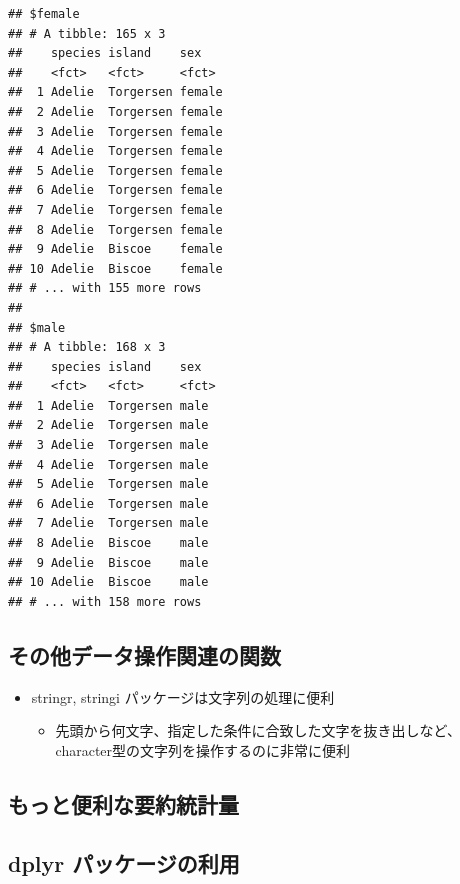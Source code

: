 \documentclass[
]{ltjsarticle}
\providecommand{\tightlist}{%
  \setlength{\itemsep}{0pt}\setlength{\parskip}{0pt}}
\begin{document}
\begin{verbatim}
## $female
## # A tibble: 165 x 3
##    species island    sex   
##    <fct>   <fct>     <fct> 
##  1 Adelie  Torgersen female
##  2 Adelie  Torgersen female
##  3 Adelie  Torgersen female
##  4 Adelie  Torgersen female
##  5 Adelie  Torgersen female
##  6 Adelie  Torgersen female
##  7 Adelie  Torgersen female
##  8 Adelie  Torgersen female
##  9 Adelie  Biscoe    female
## 10 Adelie  Biscoe    female
## # ... with 155 more rows
## 
## $male
## # A tibble: 168 x 3
##    species island    sex  
##    <fct>   <fct>     <fct>
##  1 Adelie  Torgersen male 
##  2 Adelie  Torgersen male 
##  3 Adelie  Torgersen male 
##  4 Adelie  Torgersen male 
##  5 Adelie  Torgersen male 
##  6 Adelie  Torgersen male 
##  7 Adelie  Torgersen male 
##  8 Adelie  Biscoe    male 
##  9 Adelie  Biscoe    male 
## 10 Adelie  Biscoe    male 
## # ... with 158 more rows
\end{verbatim}

\hypertarget{ux305dux306eux4ed6ux30c7ux30fcux30bfux64cdux4f5cux95a2ux9023ux306eux95a2ux6570}{%
\subsection{その他データ操作関連の関数}\label{ux305dux306eux4ed6ux30c7ux30fcux30bfux64cdux4f5cux95a2ux9023ux306eux95a2ux6570}}

\begin{itemize}
\tightlist
\item
  stringr, stringi パッケージは文字列の処理に便利

  \begin{itemize}
  \tightlist
  \item
    先頭から何文字、指定した条件に合致した文字を抜き出しなど、character型の文字列を操作するのに非常に便利
  \end{itemize}
\end{itemize}

\hypertarget{ux3082ux3063ux3068ux4fbfux5229ux306aux8981ux7d04ux7d71ux8a08ux91cf}{%
\subsection{もっと便利な要約統計量}\label{ux3082ux3063ux3068ux4fbfux5229ux306aux8981ux7d04ux7d71ux8a08ux91cf}}

\hypertarget{dplyr-ux30d1ux30c3ux30b1ux30fcux30b8ux306eux5229ux7528}{%
\subsection{dplyr
パッケージの利用}\label{dplyr-ux30d1ux30c3ux30b1ux30fcux30b8ux306eux5229ux7528}}
\end{document}
